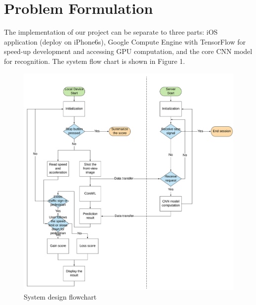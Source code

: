 \documentclass{article}
\begin{document}
\section{Problem Formulation}
The implementation of our project can be separate to three parts: iOS application (deploy on iPhone6s), Google Compute Engine with TensorFlow for speed-up development and accessing GPU computation, and the core CNN model for recognition. The system flow chart is shown in Figure 1.
\begin{figure}
  \centering
  \begin{minipage}{.4\textwidth}
    \centering
    \includegraphics[width=1.2\linewidth]{system_flowchart.png}
    \caption{System design flowchart}
    \label{fig:fig_1}
  \end{minipage}
  \begin{minipage}{.4\textwidth}
    \centering

\end{minipage}
\end{figure}
\end{document}
